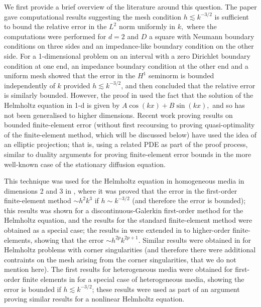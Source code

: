 We first provide a brief overview of the literature around this question. The paper \cite[\S 3]{BaGoTu:85} gave computational results suggesting the mesh condition $h \lesssim k^{-3/2}$ is sufficient to bound the relative error in the $L^2$ norm uniformly in $k,$ where the computations were performed for $d=2$ and $D$ a square with Neumann boundary conditions on three sides and an impedance-like boundary condition on the other side. For a 1-dimensional problem on an interval with a zero Dirichlet boundary condition at one end, an impedance boundary condition at the other end and a uniform mesh \cite[Theorem 5, \S 3.4]{IhBa:95} showed that the error in the $H^1$ seminorm is bounded independently of $k$ provided $h \lesssim k^{-3/2}$, and then concluded that the relative error is similarly bounded. However, the proof in \cite{IhBa:95} used the fact that the solution of the Helmholtz equation in 1-d is given by $A \cos(kx) + B \sin(kx),$ and so has not been generalised to higher dimensions. Recent work proving results on bounded finite-element error (without first recoursing to proving quasi-optimality of the finite-element method, which will be discussed below) have used the idea of an elliptic projection; that is, using a related PDE as part of the proof process, similar to duality arguments for proving finite-element error bounds in the more well-known case of the stationary diffusion equation.

This technique was used for the Helmholtz equation in homogeneous media in dimensions 2 and 3 in \cite{Wu:14}, where it was proved that the error in the first-order finite-element method $\sim h^2k^3$ if $h \sim k^{-3/2}$ (and therefore the error is bounded); this results was shown for a discontinuous-Galerkin first-order method for the Helmholtz equation, and the results for the standard finite-element method were obtained as a special case; the results in \cite{Wu:14} were extended in \cite{DuWu:15} to higher-order finite-elements, showing that the error $\sim h^{2p}k^{2p+1}.$ Similar results were obtained in \cite{ChNi:18} for Helmholtz problems with corner singularities (and therefore there were additional contraints on the mesh arising from the corner singularities, that we do not mention here). The first results for heterogeneous media were obtained for first-order finite elements in \cite[Lemma 3.3]{WuZo:18} for a special case of heterogeneous media, showing the error is bounded if $h \lesssim k^{-3/2}$; these results were used as part of an argument proving similar results for a nonlinear Helmholtz equation.

